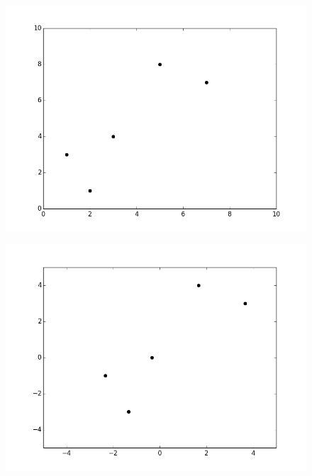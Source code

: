 \documentclass[a4paper]{article}
\begin{document}
\begin{figure}[!htb]
\centering
\begin{minipage}{.5\textwidth}
  \centering
  \includegraphics[scale = 0.32]{fig1.png}
  \label{fig:test1}
\end{minipage}%
\begin{minipage}{.5\textwidth}
  \centering
  \includegraphics[scale= 0.32]{fig2.png}
  \label{fig:test2}
\end{minipage}
\end{figure}
\end{document}
